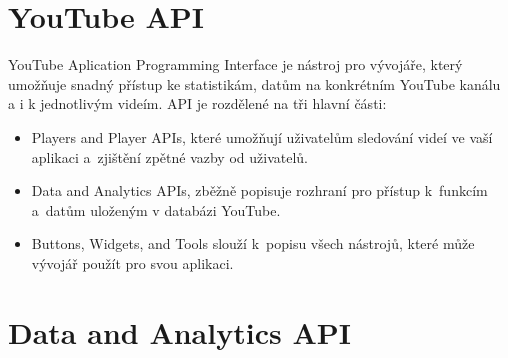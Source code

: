 \section{YouTube API}
\par YouTube Aplication Programming Interface\cite{apistart} je nástroj pro vývojáře, který umožňuje snadný přístup ke statistikám, datům na konkrétním YouTube kanálu a i k jednotlivým videím. API je rozdělené na tři hlavní části:
\begin{itemize}
	\item{Players and Player APIs, které umožňují uživatelům sledování videí ve vaší aplikaci a~zjištění zpětné vazby od uživatelů.}
	\item{Data and Analytics APIs, zběžně popisuje rozhraní pro přístup k~funkcím a~datům uloženým v databázi YouTube.}
	\item{Buttons, Widgets, and Tools slouží k~popisu všech nástrojů, které může vývojář použít pro svou aplikaci.}
\end{itemize}

\section{Data and Analytics API}
